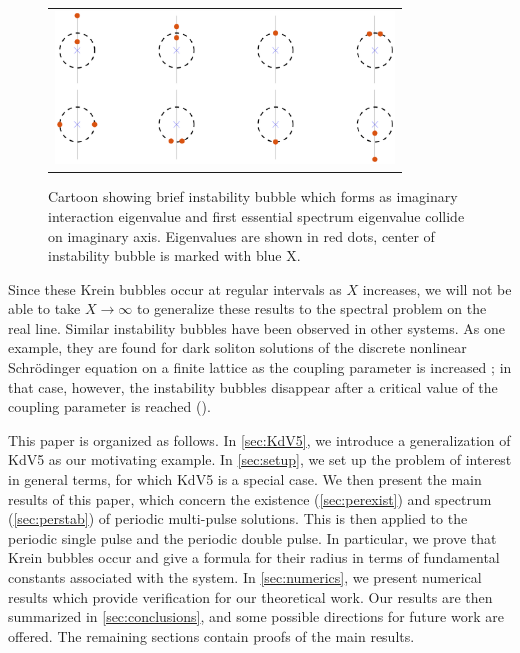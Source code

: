 \documentclass[10pt,reqno]{amsart}
\theoremstyle{plain}
\theoremstyle{definition}
\theoremstyle{remark}
\numberwithin{theorem}{section}
\numberwithin{equation}{section}
\begin{document}
\begin{figure}[H]
\begin{center}
\begin{tabular}{c}
\includegraphics[width=9cm]{images/KreinBubbleCartoon.eps}
\end{tabular}
\end{center}
\caption{Cartoon showing brief instability bubble which forms as imaginary interaction eigenvalue and first essential spectrum eigenvalue collide on imaginary axis. Eigenvalues are shown in red dots, center of instability bubble is marked with blue X.}
\label{fig:KreinBubbleCartoon}
\end{figure}
Since these Krein bubbles occur at regular intervals as $X$ increases, we will not be able to take $X \rightarrow \infty$ to generalize these results to the spectral problem on the real line. Similar instability bubbles have been observed in other systems. As one example, they are found for dark soliton solutions of the discrete nonlinear Schr{\"o}dinger equation on a finite lattice as the coupling parameter is increased \cite{Johansson1999}; in that case, however, the instability bubbles disappear after a critical value of the coupling parameter is reached (\cite[Figure 2]{Johansson1999}).

This paper is organized as follows. In \cref{sec:KdV5}, we introduce a generalization of KdV5 as our motivating example. In \cref{sec:setup}, we set up the problem of interest in general terms, for which KdV5 is a special case. We then present the main results of this paper, which concern the existence (\cref{sec:perexist}) and spectrum (\cref{sec:perstab}) of periodic multi-pulse solutions. This is then applied to the periodic single pulse and the periodic double pulse. In particular, we prove that Krein bubbles occur and give a formula for their radius in terms of fundamental constants associated with the system. In \cref{sec:numerics}, we present numerical results which provide verification for our theoretical work. Our results are then summarized in \cref{sec:conclusions}, and some possible directions for future work are offered. The remaining sections contain proofs of the main results.
\end{document}

